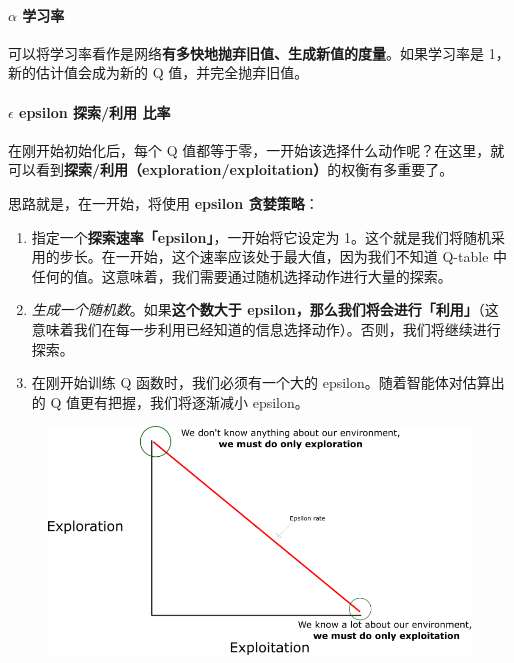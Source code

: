 \documentclass[UTF8,a4paper,12pt]{ctexbook}
\begin{document}
			
			\paragraph{$\alpha$ 学习率}
				可以将学习率看作是网络\textbf{有多快地抛弃旧值、生成新值的度量}。如果学习率是 1，新的估计值会成为新的 Q 值，并完全抛弃旧值。
			
			\paragraph{$\epsilon$ epsilon 探索/利用 比率}
				在刚开始初始化后，每个 Q 值都等于零，一开始该选择什么动作呢？在这里，就可以看到\textbf{探索/利用}\textbf{（exploration/exploitation）}的权衡有多重要了。
			
				思路就是，在一开始，将使用 \textbf{epsilon 贪婪策略}：
				
				\begin{enumerate}[itemindent = 1em]
					\item 指定一个\textbf{探索速率「epsilon」}，一开始将它设定为 1。这个就是我们将随机采用的步长。在一开始，这个速率应该处于最大值，因为我们不知道 Q-table 中任何的值。这意味着，我们需要通过随机选择动作进行大量的探索。
					\item \textit{生成一个随机数}。如果\textbf{这个数大于 epsilon，那么我们将会进行「利用」}（这意味着我们在每一步利用已经知道的信息选择动作）。否则，我们将继续进行探索。
					\item 在刚开始训练 Q 函数时，我们必须有一个大的 epsilon。随着智能体对估算出的 Q 值更有把握，我们将逐渐减小 epsilon。
				\end{enumerate}
				
				\begin{figure}[H]
					\centering
					\includegraphics[width=\linewidth]{epsilon}
				\end{figure}
	
\end{document}
